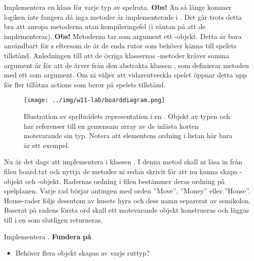 \Subtask Implementera en klass för varje typ av spelruta. 
\newline
\newline
\noindent
\textbf{Obs!} Än så länge kommer logiken inte fungera då inga metoder är implementerade i . Det går trots detta bra att anropa metoderna utan kompileringsfel (i väntan på att de implementeras).
\newline
\newline
\noindent
\textbf{Obs!} Metoderna  tar som argument ett -objekt. Detta är bara användbart för s eftersom de är de enda rutor som behöver känna till spelets tillstånd. Anledningen till att de övriga klassernas -metoder kräver samma argument är för att de ärver från den abstrakta klassen , som definierar metoden med ett  som argument. Om ni väljer att vidareutveckla spelet öppnar detta upp för fler tillåtna actions som beror på spelets tillstånd.


\begin{figure}[H]
\centering
\texttt{[image: ../img/w11-lab/boarddiagram.png]}
\caption {Illustration av spelbrädets representation i en . Objekt av typen  och  har referenser till en gemensam array av de inlästa korten motsvarande sin typ. Notera att elementens ordning i listan här bara är ett exempel.}
\label{fig:scalajava:lthopoly-team:boarddiagram}
\end{figure}

\Task Nu är det dags att implementera  i klassen . I denna metod skall ni läsa in från filen board.txt och nyttja de metoder ni redan skrivit för att nu kunna skapa -objekt och -objekt. Radernas ordning i filen bestämmer deras ordning på spelplanen. Varje rad börjar antingen med orden ''Move'', ''Money'' eller ''House''. House-rader följs dessutom av husets hyra och dess namn separerat av semikolon. Baserat på radens första ord skall ett motsvarande objekt konstrueras och läggas till i en  som slutligen returneras.

\Subtask Implementera .
\newline
\newline
\textbf{Fundera på}
\begin{itemize}
\item Behöver flera objekt skapas av varje ruttyp?
\end{itemize}

